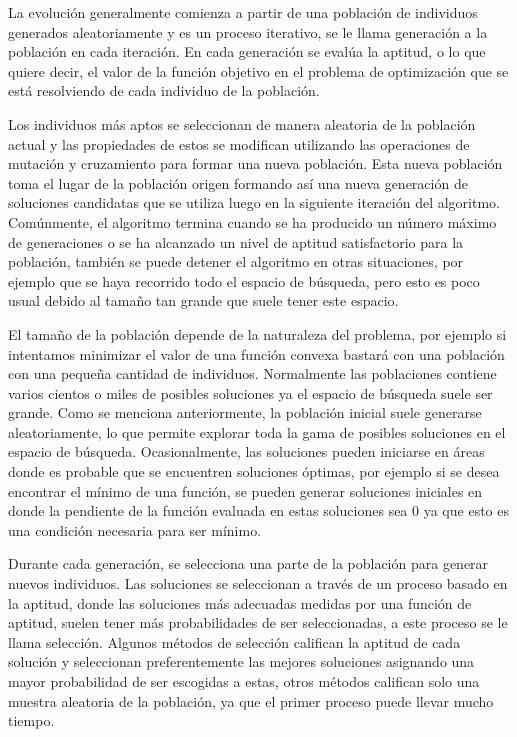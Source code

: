 La evolución generalmente comienza a partir de una población de individuos generados aleatoriamente y es un proceso iterativo, se le llama generación a la población en cada iteración. En cada generación se evalúa la aptitud, o lo que quiere decir, el valor de la función objetivo en el problema de optimización que se está resolviendo de cada individuo de la población.

Los individuos más aptos se seleccionan de manera aleatoria de la población actual y las propiedades de estos se modifican utilizando las operaciones de mutación y cruzamiento para formar una nueva población. Esta nueva población toma el lugar de la población origen formando así una nueva generación de soluciones candidatas que se utiliza luego en la siguiente iteración del algoritmo. Comúnmente, el algoritmo termina cuando se ha producido un número máximo de generaciones o se ha alcanzado un nivel de aptitud satisfactorio para la población, también se puede detener el algoritmo en otras situaciones, por ejemplo que se haya recorrido todo el espacio de búsqueda, pero esto es poco usual debido al tamaño tan grande que suele tener este espacio.

El tamaño de la población depende de la naturaleza del problema, por ejemplo si intentamos minimizar el valor de una función convexa bastará con una población con una pequeña cantidad de individuos. Normalmente las poblaciones contiene varios cientos o miles de posibles soluciones ya el espacio de búsqueda suele ser grande. Como se menciona anteriormente, la población inicial suele generarse aleatoriamente, lo que permite explorar toda la gama de posibles soluciones en el espacio de búsqueda. Ocasionalmente, las soluciones pueden iniciarse en áreas donde es probable que se encuentren soluciones óptimas, por ejemplo si se desea encontrar el mínimo de una función, se pueden generar soluciones iniciales en donde la pendiente de la función evaluada en estas soluciones sea $0$ ya que esto es una condición necesaria para ser mínimo.

Durante cada generación, se selecciona una parte de la población para generar nuevos individuos. Las soluciones se seleccionan a través de un proceso basado en la aptitud, donde las soluciones más adecuadas medidas por una función de aptitud, suelen tener más probabilidades de ser seleccionadas, a este proceso se le llama selección. Algunos métodos de selección califican la aptitud de cada solución y seleccionan preferentemente las mejores soluciones asignando una mayor probabilidad de ser escogidas a estas, otros métodos califican solo una muestra aleatoria de la población, ya que el primer proceso puede llevar mucho tiempo.

